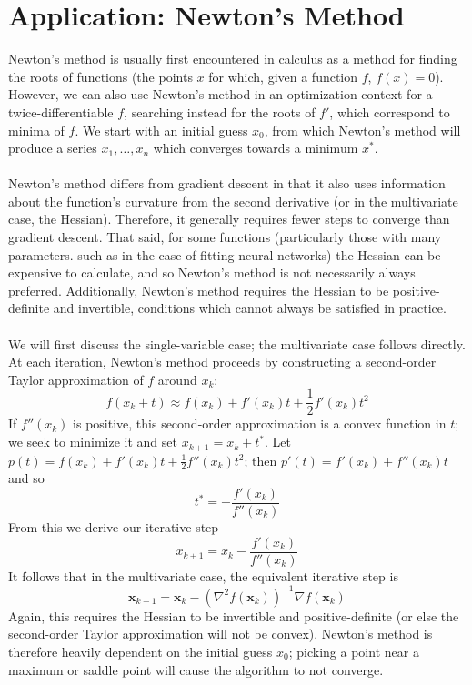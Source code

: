 \documentclass{article}
\begin{document}
\section*{Application: Newton's Method}
Newton's method is usually first encountered in calculus as a method for finding the roots of functions (the points $x$ for which, given a function $f$, $f(x) = 0$). However, we can also use Newton's method in an optimization context for a twice-differentiable $f$, searching instead for the roots of $f'$, which correspond to minima of $f$. We start with an initial guess $x_0$, from which Newton's method will produce a series $x_1, \hdots, x_n$ which converges towards a minimum $x^*$. \\\\
Newton's method differs from gradient descent in that it also uses information about the function's curvature from the second derivative (or in the multivariate case, the Hessian). Therefore, it generally requires fewer steps to converge than gradient descent. That said, for some functions (particularly those with many parameters. such as in the case of fitting neural networks) the Hessian can be expensive to calculate, and so Newton's method is not necessarily always preferred. Additionally, Newton's method requires the Hessian to be positive-definite and invertible, conditions which cannot always be satisfied in practice. \\\\
We will first discuss the single-variable case; the multivariate case follows directly. At each iteration, Newton's method proceeds by constructing a second-order Taylor approximation of $f$ around $x_k$:
$$ f(x_k + t) \approx f(x_k) + f'(x_k)t + \frac{1}{2}f'(x_k)t^2$$
If $f''(x_k)$ is positive, this second-order approximation is a convex function in $t$; we seek to minimize it and set $x_{k+1} = x_k + t^*$. Let $p(t) = f(x_k) + f'(x_k)t + \frac{1}{2}f''(x_k)t^2$; then $p'(t) = f'(x_k) + f''(x_k)t$ and so $$t^* = -\frac{f'(x_k)}{f''(x_k)}$$
From this we derive our iterative step $$x_{k+1} = x_k - \frac{f'(x_k)}{f''(x_k)}$$
It follows that in the multivariate case, the equivalent iterative step is $$\mathbf{x}_{k+1} = \mathbf{x}_k - (\nabla^2f(\mathbf{x}_k))^{-1}\nabla f(\mathbf{x}_k)$$
Again, this requires the Hessian to be invertible and positive-definite (or else the second-order Taylor approximation will not be convex). Newton's method is therefore heavily dependent on the initial guess $x_0$; picking a point near a maximum or saddle point will cause the algorithm to not converge.
\end{document}
